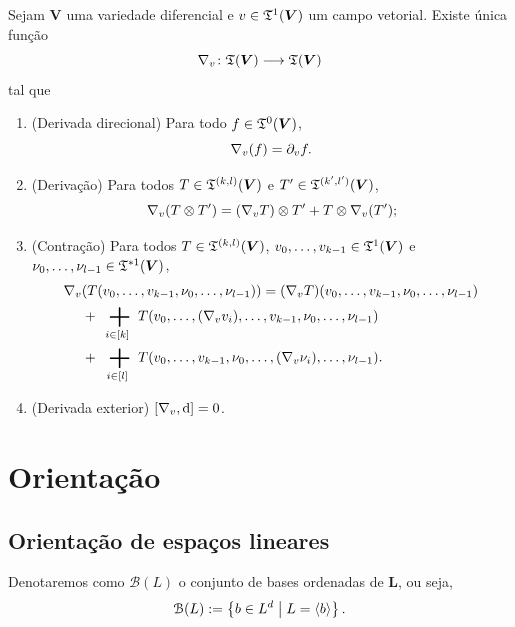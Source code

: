 \begin{proposition}
Sejam $\bm V$ uma variedade diferencial e $v \in \mathfrak{T}^1(\bm V)$ um campo vetorial. Existe única função
	\begin{equation*}
	\nabla_v\colon \allowbreak \mathfrak{T}(\bm V) \longrightarrow \mathfrak{T}(\bm V)
	\end{equation*}
tal que
	\begin{enumerate}
	\item (Derivada direcional) Para todo $f \in \mathfrak{T}^0(\bm V)$,
		\begin{equation*}
		\nabla_v(f) = \partial_v f.
		\end{equation*}
	\item (Derivação) Para todos $T \in \mathfrak{T}^{(k,l)}(\bm V)$ e $T' \in \mathfrak{T}^{(k',l')}(\bm V)$,
		\begin{equation*}
		\nabla_v(T \otimes T') = (\nabla_v T) \otimes T' + T \otimes \nabla_v (T');
		\end{equation*}
	\item (Contração) Para todos $T \in \mathfrak{T}^{(k,l)}(\bm V)$, $v_0,\ldots,v_{k-1} \in \mathfrak{T}^1(\bm V)$ e $\nu_0,\ldots,\nu_{l-1} \in \mathfrak{T}^{*1}(\bm V)$,
		\begin{align*}
		\Dir_v &(T(v_0,\ldots,v_{k-1},\nu_0,\ldots,\nu_{l-1})) = (\Dir_v T)(v_0,\ldots,v_{k-1},\nu_0,\ldots,\nu_{l-1}) \\
			&+ \sum_{i \in [k]} T(v_0,\ldots,(\Dir_v v_i),\ldots,v_{k-1},\nu_0,\ldots,\nu_{l-1}) \\
			&+ \sum_{i \in [l]} T(v_0,\ldots,v_{k-1},\nu_0,\ldots,(\Dir_v \nu_i),\ldots,\nu_{l-1}).
		\end{align*}
	\item (Derivada exterior) $\left[{\nabla_v},{\mathrm{d}}\right]=0$.
	\end{enumerate}
\end{proposition}





\section{Orientação}

\subsection{Orientação de espaços lineares}

Denotaremos como $\mathcal{B}(L)$ o conjunto de bases ordenadas de $\bm L$, ou seja,
	\begin{equation*}
	\mathcal{B}(L) := \left\{ b \in L^d \;\middle\vert\; L = \left\langle b \right\rangle \right\}.
	\end{equation*}

